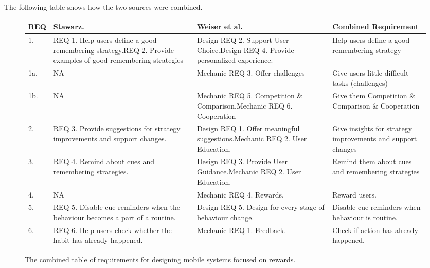 The following table shows how the two sources \cite{thesis_kathy, article_taxonomy_motivational_affordances_meaningful} were combined.

\renewcommand{\arraystretch}{1.5} %
\begin{figure}[ht] %
    \centering


\begin{center}
\begin{tabular}{ |p{.8cm}|p{4cm}|p{4.5cm}|p{4.5cm}| }
  \hline
  \textbf{REQ} & \textbf{Stawarz. \cite{thesis_kathy}} & \textbf{Weiser et al. \cite{article_taxonomy_motivational_affordances_meaningful}} & \textbf{Combined Requirement} \\ \hline %
  1.  & REQ 1. Help users define a good remembering strategy.\newline REQ 2. Provide examples of good remembering strategies & Design REQ 2. Support User Choice.\newline Design REQ 4. Provide personalized experience. & Help users define a good remembering strategy \\ \hline
  1a. & N\/A & Mechanic REQ 3. Offer challenges & Give users little difficult tasks (challenges) \\ \hline
  1b. & N\/A & Mechanic REQ 5. Competition \& Comparison.\newline Mechanic REQ 6. Cooperation & Give them Competition \& Comparison \& Cooperation \\ \hline
  2.  & REQ 3. Provide suggestions for strategy improvements and support changes. & Design REQ 1. Offer meaningful suggestions.\newline Mechanic REQ 2. User Education. & Give insights for strategy improvements and support changes \\ \hline
  3.  & REQ 4. Remind about cues and remembering strategies. & Design REQ 3. Provide User Guidance.\newline Mechanic REQ 2. User Education. & Remind them about cues and remembering strategies \\ \hline
  4.  & N\/A & Mechanic REQ 4. Rewards. & Reward users. \\ \hline
  5.  & REQ 5. Disable cue reminders when the behaviour becomes a part of a routine. & Design REQ 5. Design for every stage of behaviour change. & Disable cue reminders when behaviour is routine. \\ \hline
  6.  & REQ 6. Help users check whether the habit has already happened. & Mechanic REQ 1. Feedback. & Check if action has already happened. \\ \hline
\end{tabular}
\end{center}

    \caption{The combined table of requirements for designing mobile systems focused on rewards.}
    \label{fig:reqtable}
\end{figure}

